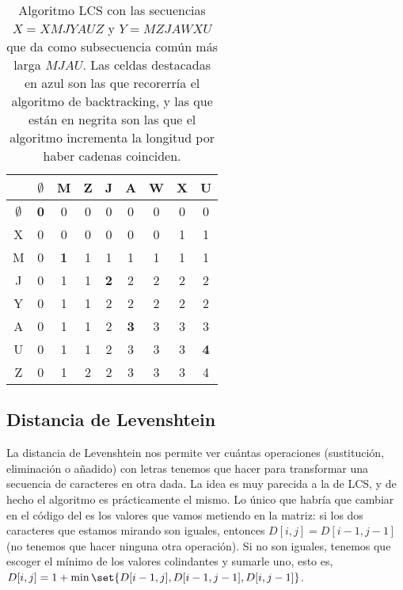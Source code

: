\documentclass[palatino, nochap]{apuntes}
\begin{document}
\begin{table}[hbtp]
\centering
\begin{tabular}{|c|c|c|c|c|c|c|c|c|}
\toprule & $\emptyset$ & M & Z & J & A & W & X & U \\ \toprule
$\emptyset$ & \cellcolor{blue!25}\textbf{0} & 0 & 0 & 0 & 0 & 0 & 0 & 0 \\ \midrule
X & \cellcolor{blue!25}0 & 0 & 0 & 0 & 0 & 0 & 1 & 1 \\ \midrule
M & 0 & \cellcolor{blue!25}\textbf{1} & \cellcolor{blue!25}1 & 1 & 1 & 1 & 1 & 1 \\ \midrule
J & 0 & 1 & 1 & \cellcolor{blue!25}\textbf{2} & 2 & 2 & 2 & 2 \\ \midrule
Y & 0 & 1 & 1 & \cellcolor{blue!25}2 & 2 & 2 & 2 & 2 \\ \midrule
A & 0 & 1 & 1 & 2 & \cellcolor{blue!25}\textbf{3} & \cellcolor{blue!25}3 & \cellcolor{blue!25}3 & 3 \\ \midrule
U & 0 & 1 & 1 & 2 & 3 & 3 & 3 & \cellcolor{blue!25}\textbf{4} \\ \midrule
Z & 0 & 1 & 2 & 2 & 3 & 3 & 3 & \cellcolor{blue!25}4 \\ \bottomrule
\end{tabular}
\caption{Algoritmo LCS con las secuencias $X = XMJYAUZ$ y $Y = MZJAWXU$ que da como subsecuencia común más larga $MJAU$. Las celdas destacadas en azul son las que recorerría el algoritmo de backtracking, y las que están en negrita son las que el algoritmo incrementa la longitud por haber cadenas coinciden.}
\label{tab:LCS}
\end{table}


\subsection{Distancia de Levenshtein}

La distancia de Levenshtein nos permite ver cuántas operaciones (sustitución, eliminación o añadido) con letras tenemos que hacer para transformar una secuencia de caracteres en otra dada. La idea es muy parecida a la de LCS, y de hecho el algoritmo es prácticamente el mismo. Lo único que habría que cambiar en el código del  es los valores que vamos metiendo en la matriz: si los dos caracteres que estamos mirando son iguales, entonces $D[i,j] = D[i-1, j-1]$ (no tenemos que hacer ninguna otra operación). Si no son iguales, tenemos que escoger el mínimo de los valores colindantes y sumarle uno, esto es, $D[i,j] = 1 + \min \set{D[i-1, j], D[i-1, j-1], D[i, j-1]}$.
\end{document}
